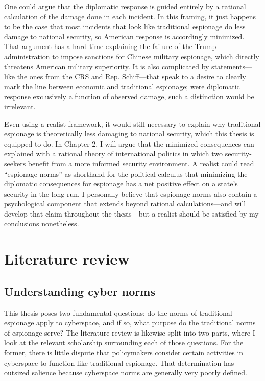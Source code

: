 \documentclass{memoir}
\begin{document}
\begin{refsegment}
One could argue that the diplomatic response is guided entirely by a rational calculation of the damage done in each incident. In this framing, it just happens to be the case that most incidents that look like traditional espionage do less damage to national security, so American response is accordingly minimized. That argument has a hard time explaining the failure of the Trump administration to impose sanctions for Chinese military espionage, which directly threatens American military superiority. It is also complicated by statements---like the ones from the CRS and Rep. Schiff---that speak to a desire to clearly mark the line between economic and traditional espionage; were diplomatic response exclusively a function of observed damage, such a distinction would be irrelevant.

Even using a realist framework, it would still necessary to explain why traditional espionage is theoretically less damaging to national security, which this thesis is equipped to do. In Chapter 2, I will argue that the minimized consequences can explained with a rational theory of international politics in which two security-seekers benefit from a more informed security environment. A realist could read ``espionage norms'' as shorthand for the political calculus that minimizing the diplomatic consequences for espionage has a net positive effect on a state's security in the long run. I personally believe that espionage norms also contain a psychological component that extends beyond rational calculations---and will develop that claim throughout the thesis---but a realist should be satisfied by my conclusions nonetheless.


\section{Literature review}
\subsection{Understanding cyber norms}
This thesis poses two fundamental questions: do the norms of traditional espionage apply to cyberspace, and if so, what purpose do the traditional norms of espionage serve? The literature review is likewise split into two parts, where I look at the relevant scholarship surrounding each of those questions. For the former, there is little dispute that policymakers consider certain activities in cyberspace to function like traditional espionage. That determination has outsized salience because cyberspace norms are generally very poorly defined.


\end{refsegment}
\end{document}
